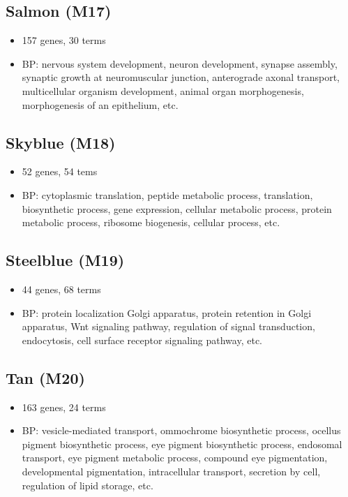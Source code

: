 \documentclass[]{article}
\providecommand{\tightlist}{%
  \setlength{\itemsep}{0pt}\setlength{\parskip}{0pt}}
\begin{document}
\hypertarget{salmon-m17}{%
\subsection{Salmon (M17)}\label{salmon-m17}}

\begin{itemize}
\tightlist
\item
  157 genes, 30 terms
\item
  BP: nervous system development, neuron development, synapse assembly,
  synaptic growth at neuromuscular junction, anterograde axonal
  transport, multicellular organism development, animal organ
  morphogenesis, morphogenesis of an epithelium, etc.
\end{itemize}

\hypertarget{skyblue-m18}{%
\subsection{Skyblue (M18)}\label{skyblue-m18}}

\begin{itemize}
\tightlist
\item
  52 genes, 54 tems
\item
  BP: cytoplasmic translation, peptide metabolic process, translation,
  biosynthetic process, gene expression, cellular metabolic process,
  protein metabolic process, ribosome biogenesis, cellular process, etc.
\end{itemize}

\hypertarget{steelblue-m19}{%
\subsection{Steelblue (M19)}\label{steelblue-m19}}

\begin{itemize}
\tightlist
\item
  44 genes, 68 terms
\item
  BP: protein localization Golgi apparatus, protein retention in Golgi
  apparatus, Wnt signaling pathway, regulation of signal transduction,
  endocytosis, cell surface receptor signaling pathway, etc.
\end{itemize}

\hypertarget{tan-m20}{%
\subsection{Tan (M20)}\label{tan-m20}}

\begin{itemize}
\tightlist
\item
  163 genes, 24 terms
\item
  BP: vesicle-mediated transport, ommochrome biosynthetic process,
  ocellus pigment biosynthetic process, eye pigment biosynthetic
  process, endosomal transport, eye pigment metabolic process, compound
  eye pigmentation, developmental pigmentation, intracellular transport,
  secretion by cell, regulation of lipid storage, etc.
\end{itemize}
\end{document}
